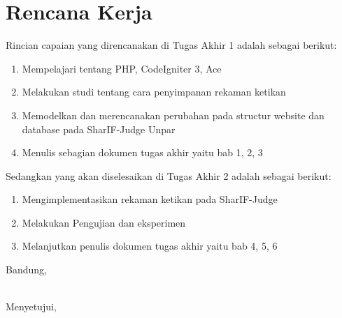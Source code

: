 \documentclass[a4paper,twoside]{article}
\begin{document}
\section{Rencana Kerja}
Rincian capaian yang direncanakan di Tugas Akhir 1 adalah sebagai berikut:
\begin{enumerate}
\item Mempelajari tentang PHP, CodeIgniter 3, Ace
\item Melakukan studi tentang cara penyimpanan rekaman ketikan
\item Memodelkan dan merencanakan perubahan pada structur website dan database pada SharIF-Judge Unpar
\item Menulis sebagian dokumen tugas akhir yaitu bab 1, 2, 3
\end{enumerate}

Sedangkan yang akan diselesaikan di Tugas Akhir 2 adalah sebagai berikut:
\begin{enumerate}
\item Mengimplementasikan rekaman ketikan pada SharIF-Judge
\item Melakukan Pengujian dan eksperimen
\item Melanjutkan penulis dokumen tugas akhir yaitu bab 4, 5, 6 
\end{enumerate}

\vspace{1cm}
\centering Bandung, \tanggal\\
\vspace{2cm} \nama \\ 
\vspace{1cm}

Menyetujui, \\
\end{document}
